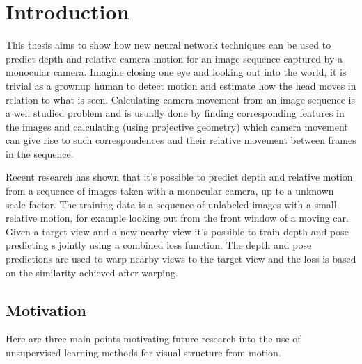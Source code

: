 \chapter{Introduction}\label{cha:introduction}

This thesis aims to show how new neural network techniques can be used to predict depth and relative camera motion for an image sequence captured by a monocular \abbrRGB camera. Imagine closing one eye and looking out into the world, it is trivial as a grownup human to detect motion and estimate how the head moves in relation to what is seen. Calculating camera movement from an image sequence is a well studied problem and is usually done by finding corresponding features in the images and calculating (using projective geometry) which camera movement can give rise to such correspondences and their relative movement between frames in the sequence.

Recent research has shown that it's possible to predict depth and relative motion from a sequence of images taken with a monocular \abbrRGB camera, up to a unknown scale factor. The training data is a sequence of unlabeled images with a small relative motion, for example looking out from the front window of a moving car. Given a target view and a new nearby view it's possible to train depth and pose predicting \abbrCNN{}s jointly using a combined loss function. The depth and pose predictions are used to warp nearby views to the target view and the loss is based on the similarity achieved after warping.

\section{Motivation}

Here are three main points motivating future research into the use of unsupervised learning methods for visual structure from motion.


